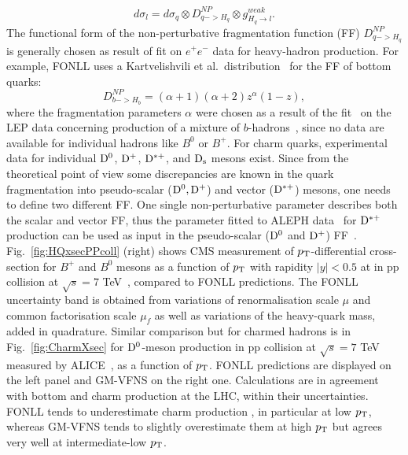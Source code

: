 \begin{equation}
d\sigma_l = d\sigma_{q} \otimes D^{NP}_{q->H_q} \otimes g^{weak}_{H_q \rightarrow l}.
\end{equation}
The functional form of the non-perturbative fragmentation function (FF) $D^{NP}_{q->H_q}$ 
is generally chosen as result of fit on $e^+e^-$ data for heavy-hadron production. For example, FONLL uses
a Kartvelishvili et al.~distribution~\cite{Kartvelishvili:1977pi} for the FF of bottom quarks:
\begin{equation}
D^{NP}_{b->H_b}= (\alpha +1 )(\alpha +2)z^{\alpha} (1-z),
\end{equation}
where the fragmentation parameters $\alpha$ were chosen as a result of the fit~\cite{Cacciari:2005uk} on the LEP data concerning production
of a mixture of $b$-hadrons~\cite{Heister:2001jg,Abbiendi:2002vt}, since no data are available for individual hadrons like $B^0$ or $B^+$.
For charm quarks, experimental data for individual ${\rm D^0}$, ${\rm D^+}$, ${\rm D^{*+}}$, and ${\rm D_s}$ mesons exist.
Since from the theoretical point of view some discrepancies are known in the quark fragmentation into 
pseudo-scalar (${\rm D^0}, {\rm D^+}$) and vector (${\rm D^{*+}}$) mesons, one needs to define two different FF. One single non-perturbative parameter
describes both the scalar and vector FF, thus the parameter fitted to ALEPH data~\cite{Barate:1999bg} for ${\rm D^{*+}}$ production can
be used as input in the pseudo-scalar (${\rm D^0}$ and ${\rm D^+}$) FF~\cite{Cacciari:2003zu}.
Fig.~\ref{fig:HQxsecPPcoll} (right) shows CMS measurement of $p_{\rm T}$-differential cross-section for $B^+$ and $B^0$ mesons
as a function of $p_{\rm T}$ with rapidity $|y| < 0.5$ at in pp collision at $\sqrt{s} = 7$ TeV~\cite{Khachatryan:2011mk,Chatrchyan:2011pw}, compared to FONLL predictions.
The FONLL uncertainty band is obtained from variations of renormalisation scale $\mu$ and common factorisation
scale $\mu_f$ as well as variations of the heavy-quark mass, added in quadrature.
Similar comparison but for charmed hadrons is in Fig.~\ref{fig:CharmXsec} for ${\rm D^0}$-meson production
in pp collision at $\sqrt{s} = 7$ TeV measured by ALICE~\cite{Acharya:2017jgo}, as a function of $p_{\rm T}$. FONLL predictions are displayed on the left panel and GM-VFNS on the right one. Calculations are in agreement with bottom and charm production at the LHC, within their
uncertainties. FONLL tends to underestimate charm production , in particular at low $p_{\rm T}$, whereas GM-VFNS
tends to slightly overestimate them at high $p_{\rm T}$ but agrees very well at intermediate-low $p_{\rm T}$. \\



